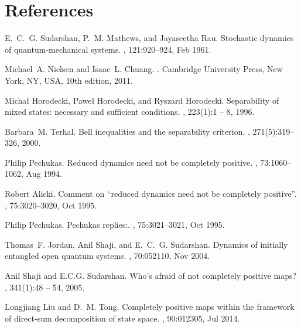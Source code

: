 \documentclass[12pt]{iopart}
\begin{document}
\section*{References}

\begin{thebibliography}{10}

E.~C.~G. Sudarshan, P.~M. Mathews, and Jayaseetha Rau.
\newblock Stochastic dynamics of quantum-mechanical systems.
, 121:920--924, Feb 1961.

Michael~A. Nielsen and Isaac~L. Chuang.
.
\newblock Cambridge University Press, New York, NY, USA, 10th edition, 2011.

Michał Horodecki, Paweł Horodecki, and Ryszard Horodecki.
\newblock Separability of mixed states: necessary and sufficient conditions.
, 223(1):1 -- 8, 1996.

Barbara~M. Terhal.
\newblock Bell inequalities and the separability criterion.
, 271(5):319--326, 2000.

Philip Pechukas.
\newblock Reduced dynamics need not be completely positive.
, 73:1060--1062, Aug 1994.

Robert Alicki.
\newblock Comment on ``reduced dynamics need not be completely positive''.
, 75:3020--3020, Oct 1995.

Philip Pechukas.
\newblock Pechukas replies:.
, 75:3021--3021, Oct 1995.

Thomas~F. Jordan, Anil Shaji, and E.~C.~G. Sudarshan.
\newblock Dynamics of initially entangled open quantum systems.
, 70:052110, Nov 2004.

Anil Shaji and E.C.G. Sudarshan.
\newblock Who's afraid of not completely positive maps?
, 341(1):48 -- 54, 2005.

Longjiang Liu and D.~M. Tong.
\newblock Completely positive maps within the framework of direct-sum
  decomposition of state space.
, 90:012305, Jul 2014.


\end{thebibliography}
\end{document}
